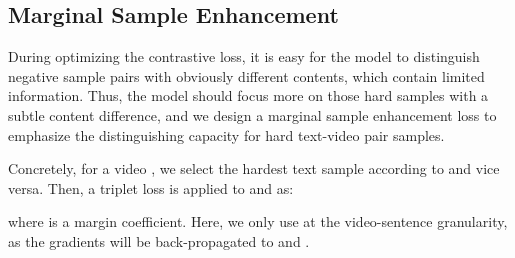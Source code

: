 \documentclass{article}
\begin{document}
\begin{table*}[t]
\centering
    \caption{The ablation study results on MSR-VTT. 'Base' indicates the baseline CLIP4Clip model. 'GDP' is the global dot product interaction, and 'TWI' uses token-wise interaction. 'HCI' is our proposed hierarchical cross-modal loss . 'Denoise' and 'MSE' are the adaptive label denoising and marginal sample enhancement strategies, respectively. 'Dual' is the post-processing of dual softmax.}
    \label{tab:ablation}
\end{table*}

\subsection{Marginal Sample Enhancement}
During optimizing the contrastive loss, it is easy for the model to distinguish negative sample pairs with obviously different contents, which contain limited information.
Thus, the model should focus more on those hard samples with a subtle content difference, and we design a marginal sample enhancement loss to emphasize the distinguishing capacity for hard text-video pair samples.

Concretely, for a video , we select the hardest text sample  according to  and vice versa.
Then, a triplet loss is applied to  and  as:

where  is a margin coefficient.
Here, we only use  at the video-sentence granularity, as the gradients will be back-propagated to  and .
\end{document}
